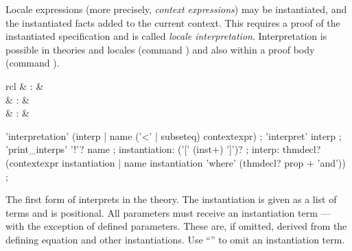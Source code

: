 \begin{isabellebody}
\begin{isamarkuptext}
\begin{descr}
  \end{descr}%
\end{isamarkuptext}%
\isamarkuptrue%
%
\isamarkuptrue%
%
\begin{isamarkuptext}%
Locale expressions (more precisely, \emph{context expressions}) may
  be instantiated, and the instantiated facts added to the current
  context.  This requires a proof of the instantiated specification
  and is called \emph{locale interpretation}.  Interpretation is
  possible in theories and locales (command \mbox{}) and also within a proof body (command \mbox{}).

  \begin{matharray}{rcl}
    \mbox{} & : &  \\
    \mbox{} & : &  \\
    \mbox{}\isa{\isactrlsup {\isacharasterisk}} & : &   \\
  \end{matharray}

  \begin{rail}
    'interpretation' (interp | name ('<' | subseteq) contextexpr)
    ;
    'interpret' interp
    ;
    'print\_interps' '!'? name
    ;
    instantiation: ('[' (inst+) ']')?
    ;
    interp: thmdecl? \\ (contextexpr instantiation |
      name instantiation 'where' (thmdecl? prop + 'and'))
    ;
  \end{rail}

  \begin{descr}

  \item [\mbox{\isa{\isacommand{interpretation}}}~\isa{expr\ insts\ {\isasymWHERE}\ eqns}]

  The first form of \mbox{} interprets  in the theory.  The instantiation is given as a list of terms
   and is positional.  All parameters must receive an
  instantiation term --- with the exception of defined parameters.
  These are, if omitted, derived from the defining equation and other
  instantiations.  Use ``\isa{{\isacharunderscore}}'' to omit an instantiation term.


\end{descr}
\end{isamarkuptext}
\end{isabellebody}
